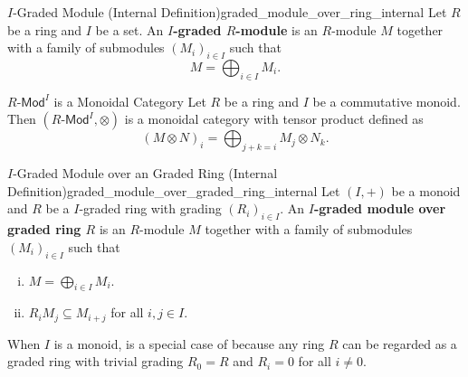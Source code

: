 \begin{definition}{$I$-Graded Module (Internal Definition)}{graded_module_over_ring_internal}
    Let $R$ be a ring and $I$ be a set. An \textbf{$I$-graded $R$-module} is an $R$-module $M$ together with a family of submodules $\left(M_i\right)_{i\in I}$ such that
    \[
        M=\bigoplus_{i\in I}M_i.
    \]
\end{definition}

\begin{proposition}{$R\text{-}\mathsf{Mod}^I$ is a Monoidal Category}{}
    Let $R$ be a ring and $I$ be a commutative monoid. Then $\left(R\text{-}\mathsf{Mod}^I,\otimes\right)$ is a monoidal category with tensor product defined as
    \[
        \left(M\otimes N\right)_i=\bigoplus_{j+k=i}M_j\otimes N_k.
    \]
\end{proposition}



\begin{definition}{$I$-Graded Module over an Graded Ring (Internal Definition)}{graded_module_over_graded_ring_internal}
    Let $(I,+)$ be a monoid and $R$ be a $I$-graded ring with grading $(R_i)_{i\in I}$. An \textbf{$I$-graded module over graded ring $R$} is an $R$-module $M$ together with a family of submodules $\left(M_i\right)_{i\in I}$ such that
    \begin{enumerate}[(i)]
        \item $M=\bigoplus_{i\in I}M_i$.
        \item $R_iM_j\subseteq M_{i+j}$ for all $i, j\in I$.
    \end{enumerate}
\end{definition}

When $I$ is a monoid,  is a special case of  because any ring $R$ can be regarded as a graded ring with trivial grading $R_0=R$ and $R_i=0$ for all $i\ne0$.



